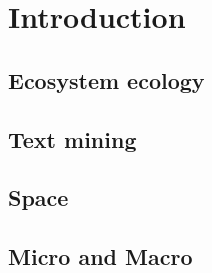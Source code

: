 % 
% 


\chapter{Introduction}
\label{cha:intro}

\section{Ecosystem ecology}
\label{sec:intro-ecosystem}

\section{Text mining}
\label{sec:text-mining}

\section{Space}
\label{sec:crete-spatial}

\section{Micro and Macro}
\label{sec:crete-micro-macro}


